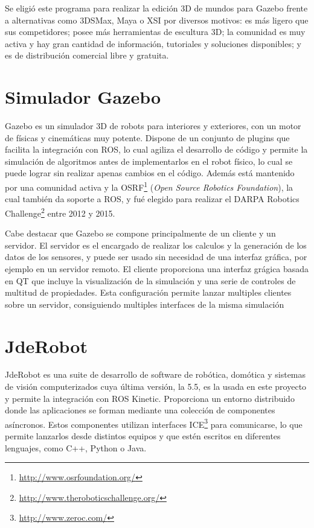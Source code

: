 Se eligió este programa para realizar la edición 3D de mundos para Gazebo frente a alternativas como 3DSMax, Maya o XSI por diversos motivos: es más ligero que sus competidores; posee más herramientas de escultura 3D; la comunidad es muy activa y hay gran cantidad de información, tutoriales y soluciones disponibles; y es de distribución comercial libre y gratuita. 


\section{Simulador Gazebo}
\label{sec:inf_gazebo}

Gazebo\cite{gazebo} es un simulador 3D de robots para interiores y exteriores, con un motor de físicas y cinemáticas muy potente. Dispone de un conjunto de plugins que facilita la integración con ROS, lo cual agiliza el desarrollo de código y permite la simulación de algoritmos antes de implementarlos en el robot físico, lo cual se puede lograr sin realizar apenas cambios en el código. Además está mantenido por una comunidad activa y la OSRF\footnote{\url{http://www.osrfoundation.org/}} (\textit{Open Source Robotics Foundation}), la cual también da soporte a ROS, y fué elegido para realizar el DARPA Robotics Challenge\footnote{\url{http://www.theroboticschallenge.org/}} entre 2012 y 2015.

Cabe destacar que Gazebo se compone principalmente de un cliente y un servidor. El servidor es el encargado de realizar los calculos y la generación de los datos de los sensores, y puede ser usado sin necesidad de una interfaz gráfica, por ejemplo en un servidor remoto. El cliente proporciona una interfaz grágica basada en QT que incluye la visualización de la simulación y una serie de controles de multitud de propiedades. Esta configuración permite lanzar multiples clientes sobre un servidor, consiguiendo multiples interfaces de la misma simulación

\section{JdeRobot}
\label{sec:inf_jderobot}

JdeRobot\cite{jderobot} es una suite de desarrollo de software de robótica, domótica y sistemas de visión computerizados cuya última versión, la 5.5, es la usada en este proyecto y permite la integración con ROS Kinetic. Proporciona un entorno distribuido donde las aplicaciones se forman mediante una colección de componentes asíncronos. Estos componentes utilizan interfaces ICE\footnote{\url{http://www.zeroc.com/}} para comunicarse, lo que permite lanzarlos desde distintos equipos y que estén escritos en diferentes lenguajes, como C++, Python o Java.

